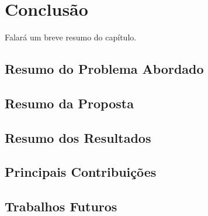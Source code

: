 \chapter{Conclusão}\label{chp:CONCLUSAO}

Falará um breve resumo do capítulo.

\section{Resumo do Problema Abordado}
\section{Resumo da Proposta}
\section{Resumo dos Resultados}
\section{Principais Contribuições}
\section{Trabalhos Futuros}




